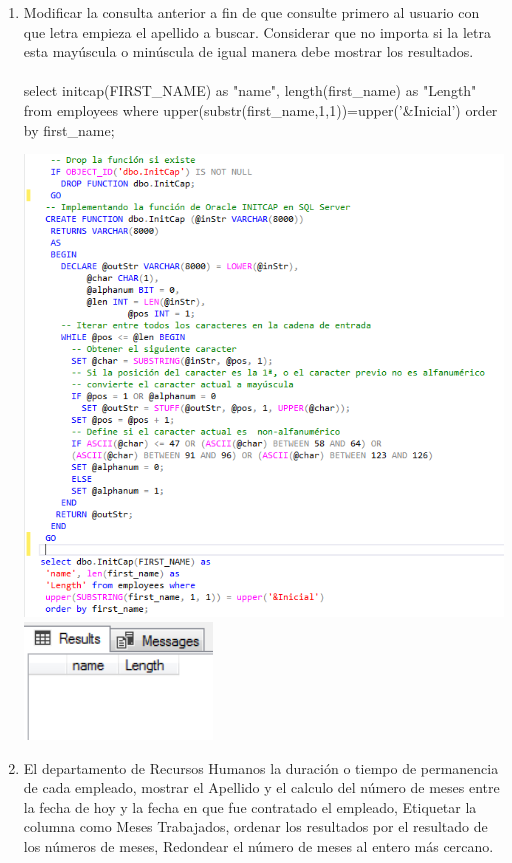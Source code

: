 \begin{enumerate}[1.]
	\item Modificar la consulta anterior a fin de que consulte primero al usuario con que letra empieza el apellido a buscar. Considerar que no importa si la letra esta may\'uscula o min\'uscula de igual manera debe mostrar los resultados.
	\\
	\\select initcap(FIRST\_NAME) as "name", length(first\_name) as "Length" from employees where upper(substr(first\_name,1,1))=upper('\&Inicial') order by first\_name;
	\begin{center}
	\includegraphics[width=15cm]{./Imagenes/actividad_05_05a}
	\includegraphics[width=5cm]{./Imagenes/actividad_05_05}
	\end{center}
	\item El departamento de Recursos Humanos la duración o tiempo de permanencia de cada empleado, mostrar el Apellido y el calculo del número de meses entre la fecha de hoy y la fecha en que fue contratado el empleado, Etiquetar la columna como Meses Trabajados, ordenar los resultados por el resultado de los n\'umeros de meses, Redondear el número de meses al entero más cercano.

\end{enumerate}
